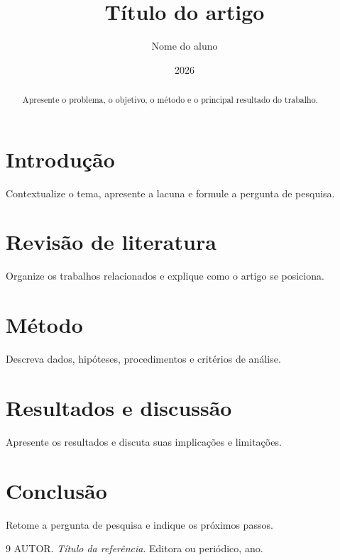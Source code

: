 \documentclass[12pt,a4paper]{article}
\title{Título do artigo}
\author{Nome do aluno}
\date{2026}
\begin{document}
\maketitle

\begin{abstract}
Apresente o problema, o objetivo, o método e o principal resultado do trabalho.
\end{abstract}

\section{Introdução}
Contextualize o tema, apresente a lacuna e formule a pergunta de pesquisa.

\section{Revisão de literatura}
Organize os trabalhos relacionados e explique como o artigo se posiciona.

\section{Método}
Descreva dados, hipóteses, procedimentos e critérios de análise.

\section{Resultados e discussão}
Apresente os resultados e discuta suas implicações e limitações.

\section{Conclusão}
Retome a pergunta de pesquisa e indique os próximos passos.

\begin{thebibliography}{9}
AUTOR. \emph{Título da referência}. Editora ou periódico, ano.
\end{thebibliography}
\end{document}
